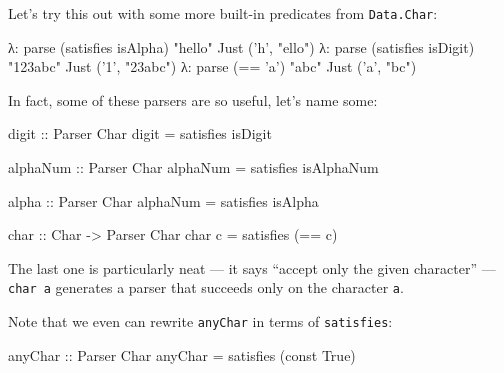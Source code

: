 \documentclass[]{article}
\newenvironment{Shaded}{}{}
\newcommand{\DataTypeTok}[1]{\textcolor[rgb]{0.56,0.13,0.00}{{#1}}}
\newcommand{\CharTok}[1]{\textcolor[rgb]{0.25,0.44,0.63}{{#1}}}
\newcommand{\StringTok}[1]{\textcolor[rgb]{0.25,0.44,0.63}{{#1}}}
\newcommand{\OtherTok}[1]{\textcolor[rgb]{0.00,0.44,0.13}{{#1}}}
\newcommand{\FunctionTok}[1]{\textcolor[rgb]{0.02,0.16,0.49}{{#1}}}
\newcommand{\NormalTok}[1]{{#1}}
\begin{document}
Let's try this out with some more built-in predicates from
\texttt{Data.Char}:

\begin{Shaded}
\begin{Highlighting}[]
\NormalTok{λ}\FunctionTok{:} \NormalTok{parse (satisfies isAlpha) }\StringTok{"hello"}
\DataTypeTok{Just} \NormalTok{(}\CharTok{'h'}\NormalTok{, }\StringTok{"ello"}\NormalTok{)}
\NormalTok{λ}\FunctionTok{:} \NormalTok{parse (satisfies isDigit) }\StringTok{"123abc"}
\DataTypeTok{Just} \NormalTok{(}\CharTok{'1'}\NormalTok{, }\StringTok{"23abc"}\NormalTok{)}
\NormalTok{λ}\FunctionTok{:} \NormalTok{parse (}\FunctionTok{==} \CharTok{'a'}\NormalTok{) }\StringTok{"abc"}
\DataTypeTok{Just} \NormalTok{(}\CharTok{'a'}\NormalTok{, }\StringTok{"bc"}\NormalTok{)}
\end{Highlighting}
\end{Shaded}

In fact, some of these parsers are so useful, let's name some:

\begin{Shaded}
\begin{Highlighting}[]
\OtherTok{digit ::} \DataTypeTok{Parser} \DataTypeTok{Char}
\NormalTok{digit }\FunctionTok{=} \NormalTok{satisfies isDigit}

\OtherTok{alphaNum ::} \DataTypeTok{Parser} \DataTypeTok{Char}
\NormalTok{alphaNum }\FunctionTok{=} \NormalTok{satisfies isAlphaNum}

\OtherTok{alpha ::} \DataTypeTok{Parser} \DataTypeTok{Char}
\NormalTok{alphaNum }\FunctionTok{=} \NormalTok{satisfies isAlpha}

\OtherTok{char ::} \DataTypeTok{Char} \OtherTok{->} \DataTypeTok{Parser} \DataTypeTok{Char}
\NormalTok{char c }\FunctionTok{=} \NormalTok{satisfies (}\FunctionTok{==} \NormalTok{c)}
\end{Highlighting}
\end{Shaded}

The last one is particularly neat --- it says ``accept only the given
character'' --- \texttt{char\ \textquotesingle{}a\textquotesingle{}}
generates a parser that succeeds only on the character \texttt{a}.

Note that we even can rewrite \texttt{anyChar} in terms of
\texttt{satisfies}:

\begin{Shaded}
\begin{Highlighting}[]
\OtherTok{anyChar ::} \DataTypeTok{Parser} \DataTypeTok{Char}
\NormalTok{anyChar }\FunctionTok{=} \NormalTok{satisfies (const }\DataTypeTok{True}\NormalTok{)}
\end{Highlighting}
\end{Shaded}
\end{document}
